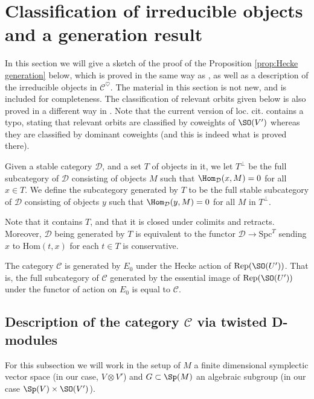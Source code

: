 \documentclass[11pt]{article}
\begin{document}
\section{Classification of irreducible objects and a generation result}\label{sec: generation}
In this section we will give a sketch of the proof of the Proposition \ref{prop:Hecke generation} below, which is proved in the same way as \cite[Corollary 3.2.3]{BFKT}, as well as a description of the irreducible objects in $\mathcal{C}^\heartsuit$. The material in this section is not new, and is included for completeness.
The classification of relevant orbits given below is also proved in a different way in \cite[§3]{Fu}. Note that the current version of loc. cit. contains a typo, stating that relevant orbits are classified by coweights of $\SO(V')$ whereas they are classified by dominant coweights (and this is indeed what is proved there).
\begin{definition}\label{def: generation}
    Given a stable category $\mathcal{D}$, and a set $T$ of objects in it, we let $T^\perp$ be the full subcategory of $\mathcal{D}$ consisting of objects $M$ such that $\Hom_{\mathcal{D}}(x, M) = 0$ for all $x\in T$.
    We define the subcategory generated by $T$ to be the full stable subcategory of $\mathcal{D}$ consisting of objects $y$ such that $\Hom_{\mathcal{D}}(y, M) = 0$ for all $M$ in $T^\perp$.
\end{definition}
Note that it contains $T$, and that it is closed under colimits and retracts.
Moreover, $\mathcal{D}$ being generated by $T$ is equivalent to the functor $\mathcal{D}\to \mathrm{Spc}^T$ sending $x$ to $\mathrm{Hom}(t, x)$ for each $t\in T$ is conservative. 
\begin{proposition}\label{prop:Hecke generation}
    The category $\mathcal{C}$ is generated by $E_0$ under the Hecke action of $\mathrm{Rep}(\SO(U'))$.
    That is, the full subcategory of $\mathcal{C}$ generated by the essential image of $\mathrm{Rep}(\SO(U'))$ under the functor of action on $E_0$ is equal to $\mathcal{C}$.
\end{proposition}
\subsection{Description of the category $\mathcal{C}$ via twisted D-modules}\label{subsec: twisted D-modules}
For this subsection we will work in the setup of $M$ a finite dimensional symplectic vector space (in our case, $V\otimes V'$) and $G\subset \Sp(M)$ an algebraic subgroup (in our case $\Sp(V)\times \SO(V')$).
\end{document}
